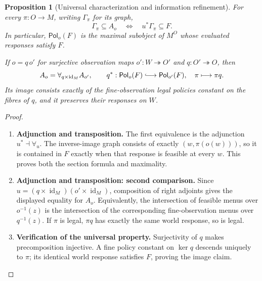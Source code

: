 \documentclass[11pt,a4paper]{article}
\numberwithin{equation}{section}
\newtheorem{proposition}[theorem]{Proposition}
\theoremstyle{definition}
\theoremstyle{remark}
\theoremstyle{plain}
\begin{document}
\begin{proposition}[Universal characterization and information refinement]
\label{prop:egt-informed-legal-universal}
For every $\pi:O\to M$, writing $\Gamma_\pi$ for its graph,
\[
 \Gamma_\pi\subseteq A_o
 \quad\Longleftrightarrow\quad u^*\Gamma_\pi\subseteq F.
\]
In particular, $\mathsf{Pol}_o(F)$ is the maximal subobject of $M^O$
whose evaluated responses satisfy $F$.

If $o=q\,o'$ for surjective observation maps
$o':W\twoheadrightarrow O'$ and $q:O'\twoheadrightarrow O$, then
\[
 A_o=\forall_{q\times\operatorname{id}_M} A_{o'},\qquad
 q^*:\mathsf{Pol}_o(F)\lhook\joinrel\longrightarrow
             \mathsf{Pol}_{o'}(F),\quad \pi\longmapsto\pi q.
\]
Its image consists exactly of the fine-observation legal policies
constant on the fibres of $q$, and it preserves their responses on $W$.
\end{proposition}
\begin{proof}
\leavevmode
\begin{enumerate}[label=\textup{(\arabic*)},leftmargin=*,itemsep=4pt,topsep=3pt]
  \item \textbf{Adjunction and transposition.} The first equivalence is the adjunction
$u^*\dashv\forall_u$. The inverse-image graph consists of exactly
$(w,\pi(o(w)))$, so it is contained in $F$ exactly when that response
is feasible at every $w$. This proves both the section formula and
maximality.
  \item \textbf{Adjunction and transposition: second comparison.} Since $u=(q\times\operatorname{id}_M)
(o'\times\operatorname{id}_M)$, composition of right adjoints gives
the displayed equality for $A_o$. Equivalently, the intersection
of feasible menus over $o^{-1}(z)$ is the intersection of the
corresponding fine-observation menus over $q^{-1}(z)$. If $\pi$ is legal, $\pi q$ has exactly the same world response,
so is legal.
  \item \textbf{Verification of the universal property.} Surjectivity of $q$ makes precomposition injective. A fine policy constant on $\ker q$ descends uniquely to $\pi$;
its identical world response satisfies $F$, proving the image claim.
\end{enumerate}
\end{proof}
\end{document}

